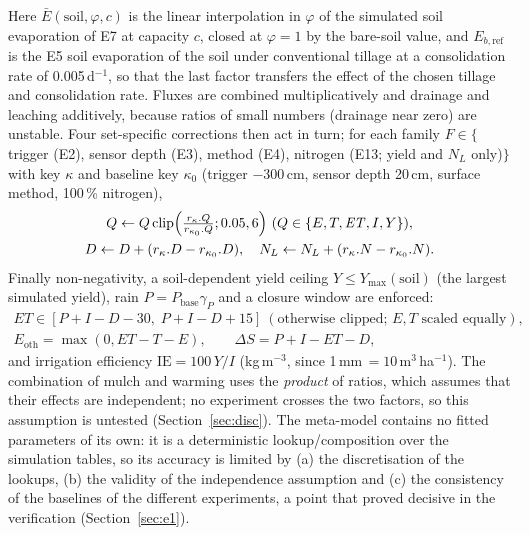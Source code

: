 \documentclass[preprint,12pt]{elsarticle}
\begin{document}
Here $\bar E(\mathrm{soil},\varphi,c)$ is the linear interpolation in $\varphi$ of the simulated soil evaporation of E7 at capacity $c$, closed at $\varphi=1$ by the bare-soil value, and $E_{b,\mathrm{ref}}$ is the E5 soil evaporation of the soil under conventional tillage at a consolidation rate of 0.005\,d$^{-1}$, so that the last factor transfers the effect of the chosen tillage and consolidation rate. Fluxes are combined multiplicatively and drainage and leaching additively, because ratios of small numbers (drainage near zero) are unstable. Four set-specific corrections then act in turn; for each family $F\in\{$trigger (E2), sensor depth (E3), method (E4), nitrogen (E13; yield and $N_L$ only)$\}$ with key $\kappa$ and baseline key $\kappa_0$ (trigger $-300$\,cm, sensor depth 20\,cm, surface method, 100\,\% nitrogen),
\begin{equation}
\begin{gathered}Q\leftarrow Q\,\mathrm{clip}\Bigl(\tfrac{r_\kappa.Q}{r_{\kappa_0}.Q};0.05,6\Bigr)\ (Q\in\{E,T,\mathit{ET},I,Y\}),\\ D\leftarrow D+(r_\kappa.D-r_{\kappa_0}.D),\quad N_L\leftarrow N_L+(r_\kappa.N-r_{\kappa_0}.N).\end{gathered}
\label{eq:corr}
\end{equation}
Finally non-negativity, a soil-dependent yield ceiling $Y\le Y_{\max}(\mathrm{soil})$ (the largest simulated yield), rain $P=P_{\mathrm{base}}\gamma_P$ and a closure window are enforced:
\begin{equation}
\begin{gathered}\mathit{ET}\in[P+I-D-30,\;P+I-D+15]\ (\text{otherwise clipped; }E,T\text{ scaled equally}),\\ E_{\mathrm{oth}}=\max(0,\mathit{ET}-T-E),\qquad \Delta S=P+I-\mathit{ET}-D,\end{gathered}
\label{eq:E1close}
\end{equation}
and irrigation efficiency $\mathrm{IE}=100\,Y/I$ (kg\,m$^{-3}$, since 1\,mm\,$=10$\,m$^3$\,ha$^{-1}$). The combination of mulch and warming uses the \emph{product} of ratios, which assumes that their effects are independent; no experiment crosses the two factors, so this assumption is untested (Section~\ref{sec:disc}). The meta-model contains no fitted parameters of its own: it is a deterministic lookup/composition over the simulation tables, so its accuracy is limited by (a) the discretisation of the lookups, (b) the validity of the independence assumption and (c) the consistency of the baselines of the different experiments, a point that proved decisive in the verification (Section~\ref{sec:e1}).
\end{document}
